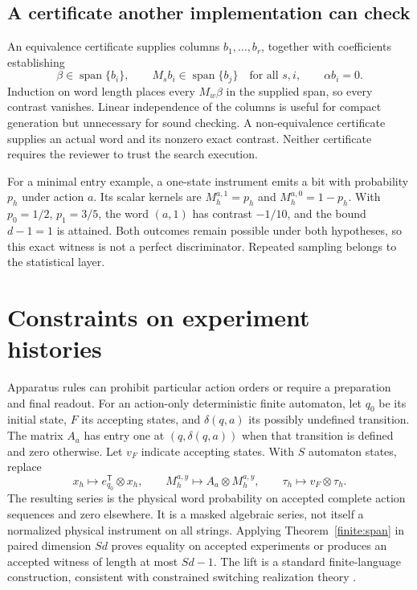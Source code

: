 \subsection{A certificate another implementation can check}

An equivalence certificate supplies columns $b_1,\ldots,b_r$, together with
coefficients establishing
\begin{equation}\label{finite:closure}
 \beta\in\operatorname{span}\{b_i\},\qquad
 M_s b_i\in\operatorname{span}\{b_j\}\quad\text{for all }s,i,
 \qquad \alpha b_i=0.
\end{equation}
Induction on word length places every $M_w\beta$ in the supplied span,
so every contrast vanishes. Linear independence of the columns is useful
for compact generation but unnecessary for sound checking. A non-equivalence
certificate supplies an actual word and its nonzero exact contrast. Neither
certificate requires the reviewer to trust the search execution.

For a minimal entry example, a one-state instrument emits a bit with
probability $p_h$ under action $a$. Its scalar kernels are $M_h^{a,1}=p_h$
and $M_h^{a,0}=1-p_h$. With $p_0=1/2$, $p_1=3/5$, the word $(a,1)$
has contrast $-1/10$, and the bound $d-1=1$ is attained. Both outcomes
remain possible under both hypotheses, so this exact witness is not a
perfect discriminator. Repeated sampling belongs to the statistical layer.

\section{Constraints on experiment histories}

Apparatus rules can prohibit particular action orders or require a
preparation and final readout. For an action-only deterministic finite
automaton, let $q_0$ be its initial state, $F$ its accepting states, and
$\delta(q,a)$ its possibly undefined transition. The matrix $A_a$ has entry
one at $(q,\delta(q,a))$ when that transition is defined and zero otherwise.
Let $v_F$ indicate accepting states. With $S$ automaton states, replace
\begin{equation}\label{finite:grammar}
 x_h\mapsto e_{q_0}^{\mathsf T}\otimes x_h,\qquad
 M_h^{a,y}\mapsto A_a\otimes M_h^{a,y},\qquad
 \tau_h\mapsto v_F\otimes\tau_h.
\end{equation}
The resulting series is the physical word probability on accepted complete
action sequences and zero elsewhere. It is a masked algebraic series,
not itself a normalized physical instrument on all strings. Applying
Theorem~\ref{finite:span} in paired dimension $Sd$ proves equality on
accepted experiments or produces an accepted witness of length at most
$Sd-1$. The lift is a standard finite-language construction, consistent
with constrained switching realization theory
\cite{f_petreczky,f_bastug}.

